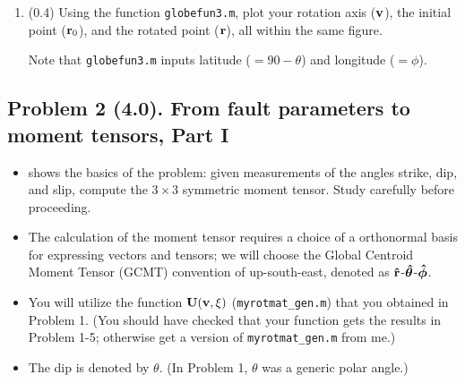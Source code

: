 \documentclass[11pt,titlepage,fleqn]{article}
\newcommand{\rotangB}{\xi}    %
\newcommand{\rotvec}{\bv}      %
\begin{document}
\begin{enumerate}
\begin{spacing}{1.0}
\begin{verbatim}
         0         0    1.0000
R2 =
    0.6667         0   -0.7454
         0    1.0000         0
    0.7454         0    0.6667
R3 =
    0.8660   -0.5000         0
    0.5000    0.8660         0
         0         0    1.0000
R4 =
    0.6667         0    0.7454
         0    1.0000         0
   -0.7454         0    0.6667
R5 =
    0.8944   -0.4472         0
    0.4472    0.8944         0
         0         0    1.0000
U =
    0.9256   -0.3036    0.2262
    0.3631    0.8809   -0.3036
   -0.1071    0.3631    0.9256
\end{verbatim}
\end{spacing}
%
{\bf If you get these results, then you did it! If not, then ask me for this function to use in Problem~2. (But you will lose 1.0 point for this request.)}

\item (0.4) Using the function \verb+globefun3.m+, plot your rotation axis ($\rotvec$), the initial point ($\mbox{${\bf r}$}_0$), and the rotated point ($\mbox{${\bf r}$}$), all within the same figure.

Note that \verb+globefun3.m+ inputs latitude ($=90-\theta$) and longitude ($=\phi$).

\end{enumerate}


\subsection*{Problem 2 (4.0). From fault parameters to moment tensors, Part I}

\begin{itemize}
\item {} shows the basics of the problem: given measurements of the angles strike, dip, and slip, compute the $3 \times 3$ symmetric moment tensor. Study  carefully before proceeding.

\item The calculation of the moment tensor requires a choice of a orthonormal basis for expressing vectors and tensors; we will choose the Global Centroid Moment Tensor (GCMT) convention of up-south-east, denoted as $\mbox{\boldmath{$\hat{\rm r}$}}$-$\mbox{\boldmath{$\hat{\theta}$}}$-$\mbox{\boldmath{$\hat{\phi}$}}$.

\item You will utilize the function $\bU(\rotvec,\rotangB)$ (\verb+myrotmat_gen.m+) that you obtained in Problem 1. (You should have checked that your function gets the results in Problem 1-5; otherwise get a version of \verb+myrotmat_gen.m+ from me.)

\item The dip is denoted by $\theta$. (In Problem 1, $\theta$ was a generic polar angle.)

\end{itemize}
\end{document}
